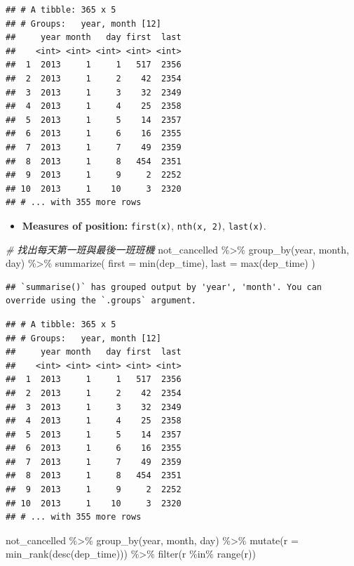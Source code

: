\documentclass[
]{book}
\newenvironment{Shaded}{\begin{snugshade}}{\end{snugshade}}
\newcommand{\AttributeTok}[1]{\textcolor[rgb]{0.77,0.63,0.00}{#1}}
\newcommand{\CommentTok}[1]{\textcolor[rgb]{0.56,0.35,0.01}{\textit{#1}}}
\newcommand{\FunctionTok}[1]{\textcolor[rgb]{0.00,0.00,0.00}{#1}}
\newcommand{\NormalTok}[1]{#1}
\newcommand{\SpecialCharTok}[1]{\textcolor[rgb]{0.00,0.00,0.00}{#1}}
\providecommand{\tightlist}{%
  \setlength{\itemsep}{0pt}\setlength{\parskip}{0pt}}
\theoremstyle{definition}
\theoremstyle{remark}
\begin{document}
\begin{verbatim}
## # A tibble: 365 x 5
## # Groups:   year, month [12]
##     year month   day first  last
##    <int> <int> <int> <int> <int>
##  1  2013     1     1   517  2356
##  2  2013     1     2    42  2354
##  3  2013     1     3    32  2349
##  4  2013     1     4    25  2358
##  5  2013     1     5    14  2357
##  6  2013     1     6    16  2355
##  7  2013     1     7    49  2359
##  8  2013     1     8   454  2351
##  9  2013     1     9     2  2252
## 10  2013     1    10     3  2320
## # ... with 355 more rows
\end{verbatim}

\begin{itemize}
\tightlist
\item
  \textbf{Measures of position:} \texttt{first(x)}, \texttt{nth(x,\ 2)}, \texttt{last(x)}.
\end{itemize}

\begin{Shaded}
\begin{Highlighting}[]
\CommentTok{\# 找出每天第一班與最後一班班機}
\NormalTok{not\_cancelled }\SpecialCharTok{\%\textgreater{}\%}
  \FunctionTok{group\_by}\NormalTok{(year, month, day) }\SpecialCharTok{\%\textgreater{}\%}
  \FunctionTok{summarize}\NormalTok{(}
    \AttributeTok{first =} \FunctionTok{min}\NormalTok{(dep\_time),}
    \AttributeTok{last =} \FunctionTok{max}\NormalTok{(dep\_time)}
\NormalTok{  )}
\end{Highlighting}
\end{Shaded}

\begin{verbatim}
## `summarise()` has grouped output by 'year', 'month'. You can override using the `.groups` argument.
\end{verbatim}

\begin{verbatim}
## # A tibble: 365 x 5
## # Groups:   year, month [12]
##     year month   day first  last
##    <int> <int> <int> <int> <int>
##  1  2013     1     1   517  2356
##  2  2013     1     2    42  2354
##  3  2013     1     3    32  2349
##  4  2013     1     4    25  2358
##  5  2013     1     5    14  2357
##  6  2013     1     6    16  2355
##  7  2013     1     7    49  2359
##  8  2013     1     8   454  2351
##  9  2013     1     9     2  2252
## 10  2013     1    10     3  2320
## # ... with 355 more rows
\end{verbatim}

\begin{Shaded}
\begin{Highlighting}[]
\NormalTok{not\_cancelled }\SpecialCharTok{\%\textgreater{}\%}
  \FunctionTok{group\_by}\NormalTok{(year, month, day) }\SpecialCharTok{\%\textgreater{}\%}
  \FunctionTok{mutate}\NormalTok{(}\AttributeTok{r =} \FunctionTok{min\_rank}\NormalTok{(}\FunctionTok{desc}\NormalTok{(dep\_time))) }\SpecialCharTok{\%\textgreater{}\%}
  \FunctionTok{filter}\NormalTok{(r }\SpecialCharTok{\%in\%} \FunctionTok{range}\NormalTok{(r))}
\end{Highlighting}
\end{Shaded}
\end{document}
